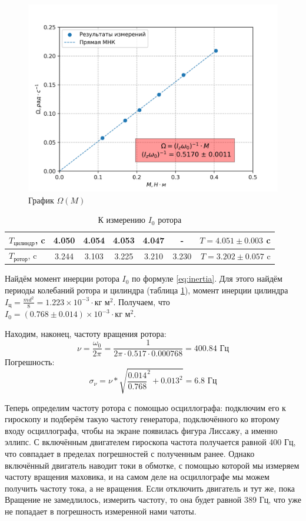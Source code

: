         \begin{figure}
            \centering
            \includegraphics[width=0.75\linewidth]{Omega-M.png}
               \caption{График $\Omega\left(M\right)$}
               \label{fig:omega}
        \end{figure}

        \begin{table}
            \centering
            \begin{tabular}{|l|c|c|c|c|c||r|}
                \hline
                $T_\text{цилиндр}$, c & 4.050 & 4.054 & 4.053 & 4.047 & - & $T = 4.051 \pm 0.003$ c\\
                \hline
                $T_\text{ротор}$, c & 3.244 & 3.103 & 3.225 & 3.210 & 3.230 &  $T = 3.202 \pm 0.057$ c\\
                \hline
            \end{tabular}
            \caption{К измерению $I_0$ ротора}
            \label{table:rotor}
        \end{table}

        \pagebreak

        Найдём момент инерции ротора $I_0$ по формуле \ref{eq:inertia}. Для этого найдём периоды колебаний ротора и цилиндра (таблица \ref{table:rotor}), момент инерции цилиндра $I_\text{ц} = \frac{md^2}{8} = 1.223\times10^{-3} \cdot \text{кг м}^2$. Получаем, что $I_0 = \left(0.768 \pm 0.014\right) \times10^{-3} \cdot \text{кг м}^2$.

        Находим, наконец, частоту вращения ротора:
        \[\nu = \frac{\omega_0}{2\pi} = \frac{1}{2\pi \cdot 0.517 \cdot 0.000768} = 400.84 \text{ Гц}\]
        Погрешность:
        \[\sigma_\nu = \nu * \sqrt{\frac{0.014}{0.768}^2 + 0.013^2} = 6.8\text{ Гц}\]

        Теперь определим частоту ротора с помощью осциллографа: подключим его к гироскопу и подберём такую частоту генератора, подключённого ко второму входу осциллографа, чтобы на экране появилась фигура Лиссажу, а именно эллипс.
        С включённым двигателем гироскопа частота получается равной 400 Гц, что совпадает в пределах погрешностей с полученным ранее.
        Однако включённый двигатель наводит токи в обмотке, с помощью которой мы измеряем частоту вращения маховика, и на самом деле на осциллографе мы можем получить частоту тока, а не вращения.
        Если отключить двигатель и тут же, пока Вращение не замедлилось, измерить частоту, то она будет равной 389 Гц, что уже не попадает в погрешность измеренной нами чатоты.


